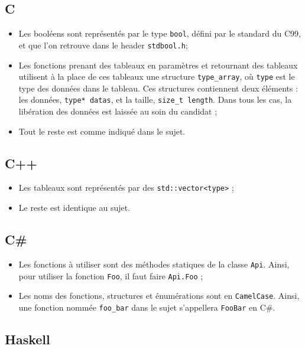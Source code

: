 \subsection{C}

\begin{itemize}
\item{Les booléens sont représentés par le type \texttt{bool}, défini par le
      standard du C99, et que l'on retrouve dans le header \texttt{stdbool.h};}
\item{Les fonctions prenant des tableaux en paramètres et retournant des
      tableaux utilisent à la place de ces tableaux une structure
      \texttt{type\_array}, où \texttt{type} est le type des données dans le
      tableau. Ces structures contiennent deux éléments : les données,
      \texttt{type* datas}, et la taille, \texttt{size\_t length}. Dans tous les
      cas, la libération des données est laissée au soin du candidat ;}
\item{Tout le reste est comme indiqué dans le sujet.}
\end{itemize}

\subsection{C++}

\begin{itemize}
\item{Les tableaux sont représentés par des \texttt{std::vector<type>} ;}
\item{Le reste est identique au sujet.}
\end{itemize}

\subsection{C\#}

\begin{itemize}
\item{Les fonctions à utiliser sont des méthodes statiques de la classe
      \texttt{Api}.
      Ainsi, pour utiliser la fonction \texttt{Foo}, il faut faire
      \texttt{Api.Foo} ;}
\item{Les noms des fonctions, structures et énumérations sont en
      \texttt{CamelCase}. Ainsi, une fonction nommée \texttt{foo\_bar} dans
      le sujet s'appellera \texttt{FooBar} en C\#.}
\end{itemize}

\subsection{Haskell}

